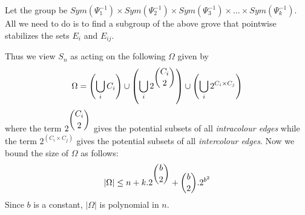 Let the group be $Sym(\Psi^{-1}_1) \times Sym(\Psi^{-1}_2) \times Sym(\Psi^{-1}_3) \times \ldots \times Sym(\Psi^{-1}_k)$. All we need to do is to find a subgroup of the above grove that pointwise stabilizes the sets $E_i$ and $E_{ij}$.

Thus we view $S_n$ as acting on the following $\Omega$ given by
\begin{equation*}
\Omega = \left(\bigcup_iC_i\right)\cup \left(\bigcup_i2^{\dbinom{C_i}{2}}\right) \cup\left(\bigcup_i2^{C_i\times C_j}\right)
\end{equation*}
where the term $2^{\dbinom{C_i}{2}}$ gives the potential subsets of all \emph{intracolour edges} while the term $2^{(C_i\times C_j)}$ gives the potential subsets of all \emph{intercolour edges}. Now we bound the size of $\Omega$ as follows:
\begin{equation*}
|\Omega| \leq n + k.2^{\dbinom{b}{2}} + \dbinom{b}{2}.2^{b^2}
\end{equation*}
Since $b$ is a constant, $|\Omega|$ is polynomial in $n$.
